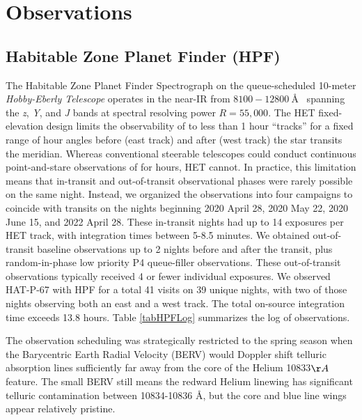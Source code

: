 \documentclass[twocolumn]{aastex631}
\begin{document}
\section{Observations}
\subsection{Habitable Zone Planet Finder (HPF)}

The Habitable Zone Planet Finder Spectrograph \citep[HPF;][]{2012SPIE.8446E..1SM,2014SPIE.9147E..1GM, 2019Optic...6..233M} on the queue-scheduled 10-meter \emph{Hobby-Eberly Telescope} \citep[HET;][]{1998SPIE.3352...34R} operates in the near-IR from $8100-12800~$\AA~ spanning the \textit{z}, \textit{Y}, and \textit{J} bands at spectral resolving power $R=55,000$. The HET fixed-elevation design \citep{2007PASP..119..556S} limits the observability of  to less than 1 hour ``tracks'' for a fixed range of hour angles before (east track) and after (west track) the star transits the meridian.  Whereas conventional steerable telescopes could conduct continuous point-and-stare observations of  for hours, HET cannot.  In practice, this limitation means that in-transit and out-of-transit observational phases were rarely possible on the same night.  Instead, we organized the observations into four campaigns to coincide with  transits on the nights beginning 2020 April 28, 2020 May 22, 2020 June 15, and 2022 April 28.  These in-transit nights had up to 14 exposures per HET track, with integration times between 5-8.5 minutes.  We obtained out-of-transit baseline observations up to 2 nights before and after the transit, plus random-in-phase low priority P4 queue-filler observations.  These out-of-transit observations typically received 4 or fewer individual exposures.  We observed HAT-P-67 with HPF for a total 41 visits on 39 unique nights, with two of those nights observing both an east and a west track.  The total on-source integration time exceeds 13.8 hours.  Table \ref{tabHPFLog} summarizes the log of observations.

The observation scheduling was strategically restricted to the spring season when the Barycentric Earth Radial Velocity (BERV) would Doppler shift telluric absorption lines sufficiently far away from the core of the Helium 10833$\AA~$ feature.  The small BERV still means the redward Helium linewing has significant telluric contamination between 10834-10836 \AA, but the core and blue line wings appear relatively pristine.
\end{document}

